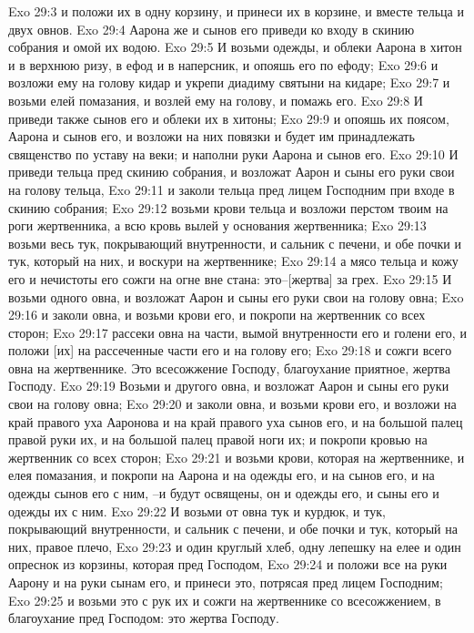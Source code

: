 Exo 29:3  и положи их в одну корзину, и принеси их в корзине, и вместе тельца и двух овнов.
Exo 29:4  Аарона же и сынов его приведи ко входу в скинию собрания и омой их водою.
Exo 29:5  И возьми одежды, и облеки Аарона в хитон и в верхнюю ризу, в ефод и в наперсник, и опояшь его по ефоду;
Exo 29:6  и возложи ему на голову кидар и укрепи диадиму святыни на кидаре;
Exo 29:7  и возьми елей помазания, и возлей ему на голову, и помажь его.
Exo 29:8  И приведи также сынов его и облеки их в хитоны;
Exo 29:9  и опояшь их поясом, Аарона и сынов его, и возложи на них повязки и будет им принадлежать священство по уставу на веки; и наполни руки Аарона и сынов его.
Exo 29:10  И приведи тельца пред скинию собрания, и возложат Аарон и сыны его руки свои на голову тельца,
Exo 29:11  и заколи тельца пред лицем Господним при входе в скинию собрания;
Exo 29:12  возьми крови тельца и возложи перстом твоим на роги жертвенника, а всю кровь вылей у основания жертвенника;
Exo 29:13  возьми весь тук, покрывающий внутренности, и сальник с печени, и обе почки и тук, который на них, и воскури на жертвеннике;
Exo 29:14  а мясо тельца и кожу его и нечистоты его сожги на огне вне стана: это--[жертва] за грех.
Exo 29:15  И возьми одного овна, и возложат Аарон и сыны его руки свои на голову овна;
Exo 29:16  и заколи овна, и возьми крови его, и покропи на жертвенник со всех сторон;
Exo 29:17  рассеки овна на части, вымой внутренности его и голени его, и положи [их] на рассеченные части его и на голову его;
Exo 29:18  и сожги всего овна на жертвеннике. Это всесожжение Господу, благоухание приятное, жертва Господу.
Exo 29:19  Возьми и другого овна, и возложат Аарон и сыны его руки свои на голову овна;
Exo 29:20  и заколи овна, и возьми крови его, и возложи на край правого уха Ааронова и на край правого уха сынов его, и на большой палец правой руки их, и на большой палец правой ноги их; и покропи кровью на жертвенник со всех сторон;
Exo 29:21  и возьми крови, которая на жертвеннике, и елея помазания, и покропи на Аарона и на одежды его, и на сынов его, и на одежды сынов его с ним, --и будут освящены, он и одежды его, и сыны его и одежды их с ним.
Exo 29:22  И возьми от овна тук и курдюк, и тук, покрывающий внутренности, и сальник с печени, и обе почки и тук, который на них, правое плечо,
Exo 29:23  и один круглый хлеб, одну лепешку на елее и один опреснок из корзины, которая пред Господом,
Exo 29:24  и положи все на руки Аарону и на руки сынам его, и принеси это, потрясая пред лицем Господним;
Exo 29:25  и возьми это с рук их и сожги на жертвеннике со всесожжением, в благоухание пред Господом: это жертва Господу.
